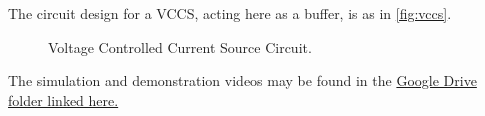 \label{sec:vccs}

\begin{arabicparts}
    \questionpart The circuit design for a VCCS, acting here as a buffer, is as in
                    \autoref{fig:vccs}.\\

    \begin{figure}[ht]
        \centering
        \scalebox{0.6}{}
        \caption{Voltage Controlled Current Source Circuit.}
        \label{fig:vccs}
    \end{figure}

    \questionpart The simulation and demonstration videos may be found in the 
                    \href{https://drive.google.com/drive/folders/1oetbbPwgUUYHVBNe5_pIktCHrrqsNl7a?usp=sharing}
                    {Google Drive folder linked here.}
\end{arabicparts}